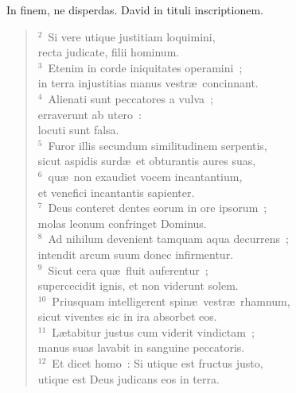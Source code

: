 \bchapter
\lettrine[lines=3,image=true,loversize=0.05,lraise=-0.03]{I}{}n finem, ne disperdas. David in tituli inscriptionem.
\begin{flushleft}\begin{verse}\vspace{6pt}${}^{2}$~Si vere utique justitiam loquimini,\\ recta judicate, filii hominum.\\
${}^{3}$~Etenim in corde iniquitates operamini~;\\ in terra injustitias manus vestr\ae\ concinnant.\\
${}^{4}$~Alienati sunt peccatores a vulva~;\\ erraverunt ab utero~:\\ locuti sunt falsa.\\
${}^{5}$~Furor illis secundum similitudinem serpentis,\\ sicut aspidis surd\ae\ et obturantis aures suas,\\
${}^{6}$~qu\ae\ non exaudiet vocem incantantium,\\ et venefici incantantis sapienter.\\
${}^{7}$~Deus conteret dentes eorum in ore ipsorum~;\\ molas leonum confringet Dominus.\\
${}^{8}$~Ad nihilum devenient tamquam aqua decurrens~;\\ intendit arcum suum donec infirmentur.\\
${}^{9}$~Sicut cera qu\ae\ fluit auferentur~;\\ supercecidit ignis, et non viderunt solem.\\
${}^{10}$~Priusquam intelligerent spin\ae\ vestr\ae\ rhamnum,\\ sicut viventes sic in ira absorbet eos.\\
${}^{11}$~L\ae tabitur justus cum viderit vindictam~;\\ manus suas lavabit in sanguine peccatoris.\\
${}^{12}$~Et dicet homo~: Si utique est fructus justo,\\ utique est Deus judicans eos in terra.\end{verse}\end{flushleft}



